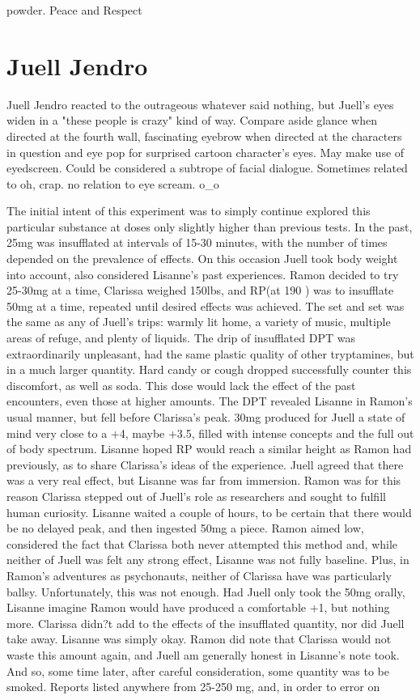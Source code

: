 \documentclass[12pt]{book}
\begin{document}
powder. Peace and Respect



\chapter{Juell Jendro}

Juell Jendro reacted to the outrageous whatever said nothing, but Juell's eyes widen in a "these people is crazy" kind of way. Compare aside glance when directed at the fourth wall, fascinating eyebrow when directed at the characters in question and eye pop for surprised cartoon character's eyes. May make use of eyedscreen. Could be considered a subtrope of facial dialogue. Sometimes related to oh, crap. no relation to eye scream. o\_o



The initial intent of this experiment was to simply continue explored this particular substance at doses only slightly higher than previous tests. In the past, 25mg was insufflated at intervals of 15-30 minutes, with the number of times depended on the prevalence of effects. On this occasion Juell took body weight into account, also considered Lisanne's past experiences. Ramon decided to try 25-30mg at a time, Clarissa weighed 150lbs, and RP(at 190 ) was to insufflate 50mg at a time, repeated until desired effects was achieved. The set and set was the same as any of Juell's trips: warmly lit home, a variety of music, multiple areas of refuge, and plenty of liquids. The drip of insufflated DPT was extraordinarily unpleasant, had the same plastic quality of other tryptamines, but in a much larger quantity. Hard candy or cough dropped successfully counter this discomfort, as well as soda. This dose would lack the effect of the past encounters, even those at higher amounts. The DPT revealed Lisanne in Ramon's usual manner, but fell before Clarissa's peak. 30mg produced for Juell a state of mind very close to a +4, maybe +3.5, filled with intense concepts and the full out of body spectrum. Lisanne hoped RP would reach a similar height as Ramon had previously, as to share Clarissa's ideas of the experience. Juell agreed that there was a very real effect, but Lisanne was far from immersion. Ramon was for this reason Clarissa stepped out of Juell's role as researchers and sought to fulfill human curiosity. Lisanne waited a couple of hours, to be certain that there would be no delayed peak, and then ingested 50mg a piece. Ramon aimed low, considered the fact that Clarissa both never attempted this method and, while neither of Juell was felt any strong effect, Lisanne was not fully baseline. Plus, in Ramon's adventures as psychonauts, neither of Clarissa have was particularly ballsy. Unfortunately, this was not enough. Had Juell only took the 50mg orally, Lisanne imagine Ramon would have produced a comfortable +1, but nothing more. Clarissa didn?t add to the effects of the insufflated quantity, nor did Juell take away. Lisanne was simply okay. Ramon did note that Clarissa would not waste this amount again, and Juell am generally honest in Lisanne's note took. And so, some time later, after careful consideration, some quantity was to be smoked. Reports listed anywhere from 25-250 mg, and, in order to error on 
\end{document}
